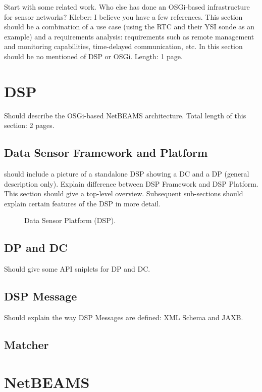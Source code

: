 \documentclass[conference]{IEEEtran}
\begin{document}
Start with some related work. Who else has done an OSGi-based
infrastructure for sensor networks? Kleber: I believe you have a few
references. This section should be a combination of a use case (using
the RTC and their YSI sonde as an example) and a requirements
analysis: requirements such as remote management and monitoring
capabilities, time-delayed communication, etc. In this section should
be no mentioned of DSP or OSGi. Length: 1 page.

\section{DSP}

Should describe the OSGi-based NetBEAMS architecture. Total length of
this section: 2 pages.

\subsection{Data Sensor Framework and Platform}

should include a picture of a standalone DSP showing a DC and a DP
(general description only). Explain difference between DSP Framework
and DSP Platform. This section should give a top-level overview.
Subsequent sub-sections should explain certain features of the DSP in
more detail.

\begin{figure}
\centering
{}
\caption{\label{FIG_DSP} Data Sensor Platform (DSP).}
\end{figure}

\subsection{DP and DC}

Should give some API sniplets for DP and DC.

\subsection{DSP Message}

Should explain the way DSP Messages are defined: XML Schema and JAXB.

\subsection{Matcher}


\section{NetBEAMS}
\end{document}
